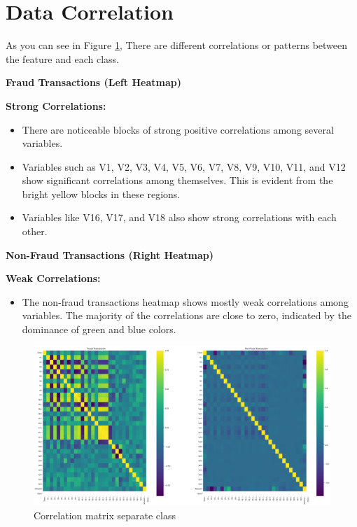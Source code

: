 \documentclass[12pt]{article}
\begin{document}
\section{Data Correlation}

As you can see in Figure \ref{fig:Correlation Matrix}, There are different correlations or patterns between the feature and each class.    

\hfill \break
\noindent\textbf{Fraud Transactions (Left Heatmap)}

\textbf{Strong Correlations:}
\begin{itemize}
    \item There are noticeable blocks of strong positive correlations among several variables.
    \item Variables such as V1, V2, V3, V4, V5, V6, V7, V8, V9, V10, V11, and V12 show significant correlations among themselves. This is evident from the bright yellow blocks in these regions.
    \item Variables like V16, V17, and V18 also show strong correlations with each other.
\end{itemize}

\bigskip

\noindent\textbf{Non-Fraud Transactions (Right Heatmap)}

\textbf{Weak Correlations:}
\begin{itemize}
    \item The non-fraud transactions heatmap shows mostly weak correlations among variables. The majority of the correlations are close to zero, indicated by the dominance of green and blue colors.
\end{itemize}
\begin{figure}[h]
    \centering
    \includegraphics[width=\linewidth]{Correlation Matrix (class separate).png}
    \caption{Correlation matrix separate class}
    \label{fig:Correlation Matrix}
\end{figure}

\newpage

\newpage

\newpage

\newpage


% 
% 
\end{document}
